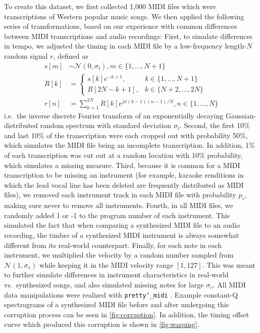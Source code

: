 To create this dataset, we first collected 1,000 MIDI files which were transcriptions of Western popular music songs.
We then applied the following series of transformations, based on our experience with common differences between MIDI transcriptions and audio recordings:
First, to simulate differences in tempo, we adjusted the timing in each MIDI file by a low-frequency length-$N$ random signal $r$, defined as
\begin{align}
s[m] &\sim \mathcal{N}(0, \sigma_t), m \in \{1, \ldots, N + 1\}\\
R[k] &= \begin{cases}
s[k]e^{-k + 1}, &k \in \{1, \ldots, N + 1\}\\
R[2N - k + 1], &k \in \{N + 2, \ldots, 2N \}
\end{cases}\\
r[n] &= \sum_{k = 1}^{2N} R[k]e^{j\pi (k - 1)(n - 1)/N}, n \in \{1, \ldots, N\}
\label{eq:offset_signal}
\end{align}
i.e.\ the inverse discrete Fourier transform of an exponentially decaying Gaussian-distributed random spectrum with standard deviation $\sigma_t$.
Second, the first 10\% and last 10\% of the transcription were each cropped out with probability 50\%, which simulates the MIDI file being an incomplete transcription.
In addition, 1\% of each transcription was cut out at a random location with 10\% probability, which simulates a missing measure.
Third, because it is common for a MIDI transcription to be missing an instrument (for example, karaoke renditions in which the lead vocal line has been deleted are frequently distributed as MIDI files), we removed each instrument track in each MIDI file with probability $p_r$, making sure never to remove all instruments.
Fourth, in all MIDI files, we randomly added 1 or -1 to the program number of each instrument.
This simulated the fact that when comparing a synthesized MIDI file to an audio recording, the timbre of a synthesized MIDI instrument is always somewhat different from its real-world counterpart.
Finally, for each note in each instrument, we multiplied the velocity by a random number sampled from $\mathcal{N}(1, \sigma_v)$ while keeping it in the MIDI velocity range $[1, 127]$.
This was meant to further simulate differences in instrument characteristics in real-world vs.\ synthesized songs, and also simulated missing notes for large $\sigma_v$.
All MIDI data manipulations were realized with \texttt{pretty\char`_midi} \cite{raffel2014pretty_midi}.
Example constant-Q spectrograms of a synthesized MIDI file before and after undergoing this corruption process can be seen in \cref{fig:corruption}.
In addition, the timing offset curve which produced this corruption is shown in \cref{fig:warping}.

